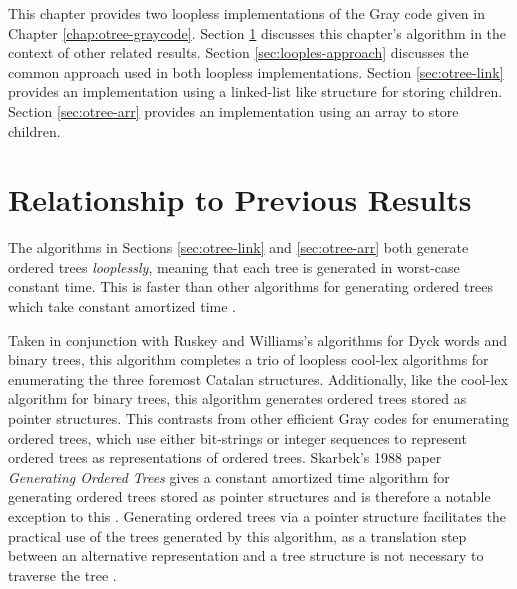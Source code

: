 This chapter provides two loopless implementations of the Gray code given in Chapter \ref{chap:otree-graycode}.  
Section \ref{sec:relationship-loopless} discusses this chapter's algorithm in the context of other related results.  Section \ref{sec:looples-approach} discusses the common approach used in both loopless implementations.  Section \ref{sec:otree-link} provides an implementation using a linked-list like structure for storing children.  Section \ref{sec:otree-arr} provides an implementation using an array to store children.  


\section{Relationship to Previous Results}\label{sec:relationship-loopless}
The algorithms in Sections \ref{sec:otree-link} and \ref{sec:otree-arr} both generate ordered trees \emph{looplessly}, meaning that each tree is generated in worst-case constant time.  This is faster than other algorithms for generating ordered trees which take constant amortized time \cite{parque2021efficient} \cite{er1985lexotrees} \cite{zaks1980lexotrees} \cite{skarbek1988pointerotrees}. 


Taken in conjunction with Ruskey and Williams's algorithms for Dyck words and binary trees, this algorithm completes a trio of loopless cool-lex algorithms for enumerating the three foremost Catalan structures.  
Additionally, like the cool-lex algorithm for binary trees, this algorithm generates ordered trees stored as pointer structures.  This contrasts from other efficient Gray codes for enumerating ordered trees, which use either bit-strings or integer sequences to represent ordered trees \cite{parque2021efficient} \cite{zaks1980lexotrees} \cite{er1985lexotrees} as representations of ordered trees.  Skarbek's 1988 paper \emph{Generating Ordered Trees} gives a constant amortized time algorithm for generating ordered trees stored as pointer structures and is therefore a notable exception to this \cite{skarbek1988pointerotrees}.  Generating ordered trees via a pointer structure facilitates the practical %
use of the trees generated by this algorithm, as a translation step between an alternative representation and a tree structure is not necessary to traverse the tree .

